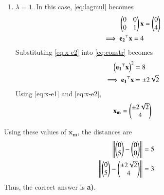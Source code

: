 \documentclass[journal,12pt,twocolumn]{IEEEtran}
\renewcommand{\vec}[1]{\boldsymbol{\mathbf{#1}}}
\begin{document}
\begin{enumerate}
\begin{enumerate}
        \item $\lambda = 1$. In this case, \eqref{eq:lagmul} becomes
        \begin{align}
            \myvec{0&0\\0&1}\vec{x} &= \myvec{0\\4} \\
            \implies \vec{e_2}^\top\vec{x} = 4
            \label{eq:x-e2}
        \end{align}
        Substituting \eqref{eq:x-e2} into \eqref{eq:constr} becomes
        \begin{align}
            \brak{\vec{e_1}^\top\vec{x}}^2 &= 8 \\
            \implies \vec{e_1}^\top\vec{x} &= \pm 2\sqrt{2}
            \label{eq:x-e1}
        \end{align}
        Using \eqref{eq:x-e1} and \eqref{eq:x-e2},
        \begin{align}
            \vec{x_m} = \myvec{\pm 2\sqrt{2}\\4}
        \end{align}
    \end{enumerate}
    Using these values of $\vec{x_m}$, the distances are
    \begin{align}
        \left\Vert\begin{pmatrix}0\\5\end{pmatrix}-\begin{pmatrix}0\\0\end{pmatrix}\right\Vert &= 5 \\
        \left\Vert\begin{pmatrix}0\\5\end{pmatrix}-\begin{pmatrix}\pm 2\sqrt{2}\\4\end{pmatrix}\right\Vert &= 3
        \label{eq:true-min}
    \end{align}
    Thus, the correct answer is \textbf{a)}.
\end{enumerate}
\end{document}
